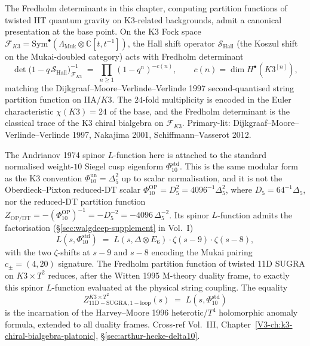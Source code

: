 \begin{remark}
\label{rem:fredholm-pf-1}
The Fredholm determinants in this chapter, computing partition functions
of twisted HT quantum gravity on K3-related backgrounds, admit a
canonical presentation at the base point. On the K3 Fock space
$\mathcal F_{K3} = \mathrm{Sym}^\bullet(\Lambda_{\mathrm{Muk}}\otimes\mathbb C[t,t^{-1}])$,
the Hall shift operator $\mathcal S_{\mathrm{Hall}}$ (the Koszul
shift on the Mukai-doubled category) acts with Fredholm determinant
\[
\det\!\bigl(1 - q\, \mathcal S_{\mathrm{Hall}}\bigr)^{-1}_{\mathcal F_{K3}} \;=\; \prod_{n\ge 1} (1 - q^n)^{-c(n)},
\qquad c(n) = \dim H^\bullet(K3^{[n]}),
\]
matching the Dijkgraaf--Moore--Verlinde--Verlinde 1997 second-quantised
string partition function on IIA/$K3$. The $24$-fold multiplicity is
encoded in the Euler characteristic $\chi(K3) = 24$ of the base, and
the Fredholm determinant is the classical trace of the K3 chiral
bialgebra on $\mathcal F_{K3}$. Primary-lit: Dijkgraaf--Moore--Verlinde--Verlinde
1997, Nakajima 2001, Schiffmann--Vasserot 2012.
\end{remark}

\begin{remark}
\label{rem:fredholm-pf-2}
The Andrianov 1974 spinor $L$-function here is attached to the
standard normalised weight-$10$ Siegel cusp eigenform
\(\Phi_{10}^{\mathrm{std}}\).  This is the same modular form as the
K3 convention \(\Phi_{10}^{\mathrm{un}}=\Delta_5^2\) up to scalar
normalisation, and it is not the Oberdieck--Pixton reduced-DT scalar
\(\Phi_{10}^{\mathrm{OP}}=D_5^2=4096^{-1}\Delta_5^2\), where
\(D_5=64^{-1}\Delta_5\), nor the reduced-DT partition function
\(Z_{\mathrm{OP/DT}}=-(\Phi_{10}^{\mathrm{OP}})^{-1}
=-D_5^{-2}=-4096\,\Delta_5^{-2}\).  Its spinor \(L\)-function admits the
factorisation (\S\ref{sec:walgdeep-supplement} in Vol.~I)
\[
L(s, \Phi_{10}^{\mathrm{std}})
\;=\; L(s, \Delta\otimes E_6)\cdot \zeta(s-9)\cdot \zeta(s-8),
\]
with the two $\zeta$-shifts at $s-9$ and $s-8$ encoding the Mukai
pairing $c_\pm = (4,20)$ signature. The Fredholm partition function of
twisted 11D SUGRA on $K3\times T^2$ reduces, after the Witten 1995 M-theory
duality frame, to exactly this spinor $L$-function evaluated at the
physical string coupling. The equality
\[
Z_{\mathrm{11D-SUGRA,1-loop}}^{K3\times T^2}(s)
\;=\; L(s, \Phi_{10}^{\mathrm{std}})
\]
is the incarnation of the Harvey--Moore 1996 heterotic/$T^4$
holomorphic anomaly formula, extended to all duality frames. Cross-ref
Vol.~III, Chapter~\ref{V3-ch:k3-chiral-bialgebra-platonic},
\S\ref{sec:arthur-hecke-delta10}.
\end{remark}
